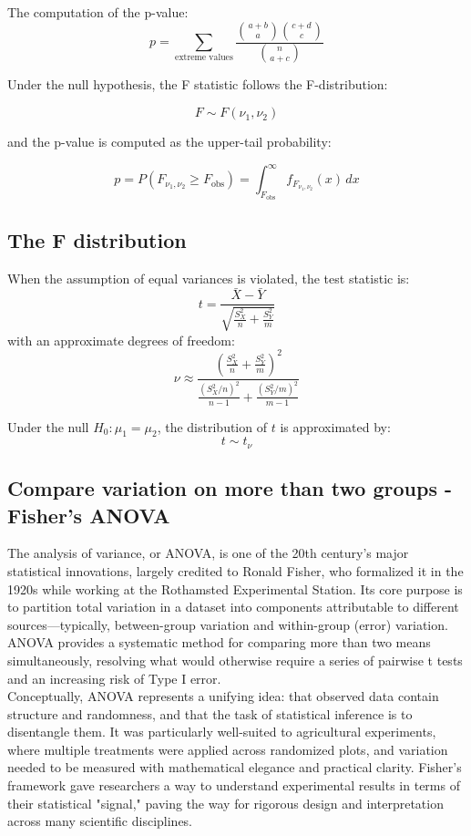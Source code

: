 \documentclass{book}
\begin{document}
The computation of the p-value:
\[
p = \sum_{\text{extreme values}} \frac{\binom{a+b}{a} \binom{c+d}{c}}{\binom{n}{a+c}}
\]

Under the null hypothesis, the F statistic follows the F-distribution:

\[
F \sim F(\nu_1, \nu_2)
\]

and the p-value is computed as the upper-tail probability:

\[
p = P(F_{\nu_1, \nu_2} \geq F_{\text{obs}}) = \int_{F_{\text{obs}}}^{\infty} f_{F_{\nu_1, \nu_2}}(x)\,dx
\]

\subsection*{The F distribution}

When the assumption of equal variances is violated, the test statistic is:
\[
t = \frac{\bar{X} - \bar{Y}}{\sqrt{\frac{S_X^2}{n} + \frac{S_Y^2}{m}}}
\]
with an approximate degrees of freedom:
\[
\nu \approx \frac{\left(\frac{S_X^2}{n} + \frac{S_Y^2}{m}\right)^2}{\frac{(S_X^2/n)^2}{n - 1} + \frac{(S_Y^2/m)^2}{m - 1}}
\]

Under the null \( H_0: \mu_1 = \mu_2 \), the distribution of \( t \) is approximated by:
\[
t \sim t_{\nu}
\]

\cite{welch1947}

\newpage

\subsection{Compare variation on more than two groups - Fisher's ANOVA}

The analysis of variance, or ANOVA, is one of the 20th century's major statistical innovations, largely credited to Ronald Fisher, who formalized it in the 1920s while working at the Rothamsted Experimental Station. Its core purpose is to partition total variation in a dataset into components attributable to different sources—typically, between-group variation and within-group (error) variation. ANOVA provides a systematic method for comparing more than two means simultaneously, resolving what would otherwise require a series of pairwise t tests and an increasing risk of Type I error.\\

Conceptually, ANOVA represents a unifying idea: that observed data contain structure and randomness, and that the task of statistical inference is to disentangle them. It was particularly well-suited to agricultural experiments, where multiple treatments were applied across randomized plots, and variation needed to be measured with mathematical elegance and practical clarity. Fisher’s framework gave researchers a way to understand experimental results in terms of their statistical "signal," paving the way for rigorous design and interpretation across many scientific disciplines.\\
\end{document}
